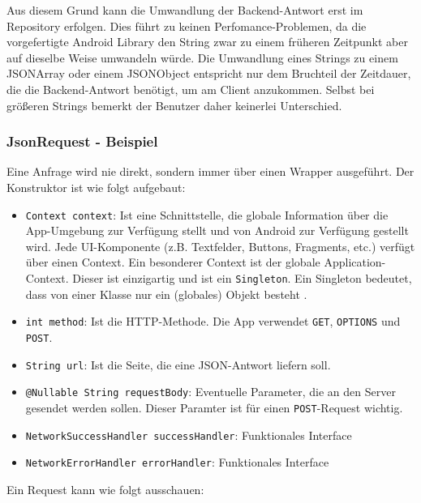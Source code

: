 Aus diesem Grund kann die Umwandlung der Backend-Antwort erst im
Repository erfolgen. Dies führt zu keinen Perfomance-Problemen, da die
vorgefertigte Android Library den String zwar zu einem früheren
Zeitpunkt aber auf dieselbe Weise umwandeln würde. Die Umwandlung eines
Strings zu einem JSONArray oder einem JSONObject entspricht nur dem
Bruchteil der Zeitdauer, die die Backend-Antwort benötigt, um am Client
anzukommen. Selbst bei größeren Strings bemerkt der Benutzer daher
keinerlei Unterschied.

\hypertarget{jsonrequest---beispiel}{%
\subsubsection{JsonRequest - Beispiel}\label{jsonrequest---beispiel}}

Eine Anfrage wird nie direkt, sondern immer über einen Wrapper
ausgeführt. Der Konstruktor ist wie folgt aufgebaut:

\begin{itemize}
\tightlist
\item
  \texttt{Context\ context}: Ist eine Schnittstelle, die globale
  Information über die App-Umgebung zur Verfügung stellt \cite{context}
  und von Android zur Verfügung gestellt wird. Jede UI-Komponente (z.B.
  Textfelder, Buttons, Fragments, etc.) verfügt über einen Context. Ein
  besonderer Context ist der globale Application-Context. Dieser ist
  einzigartig und ist ein \texttt{Singleton}. Ein Singleton bedeutet,
  dass von einer Klasse nur ein (globales) Objekt besteht
  \cite{singleton}.
\item
  \texttt{int\ method}: Ist die HTTP-Methode. Die App verwendet
  \texttt{GET}, \texttt{OPTIONS} und \texttt{POST}.
\item
  \texttt{String\ url}: Ist die Seite, die eine JSON-Antwort liefern
  soll.
\item
  \texttt{@Nullable\ String\ requestBody}: Eventuelle Parameter, die an
  den Server gesendet werden sollen. Dieser Paramter ist für einen
  \texttt{POST}-Request wichtig.
\item
  \texttt{NetworkSuccessHandler\ successHandler}: Funktionales Interface
\item
  \texttt{NetworkErrorHandler\ errorHandler}: Funktionales Interface
\end{itemize}

Ein Request kann wie folgt ausschauen:

